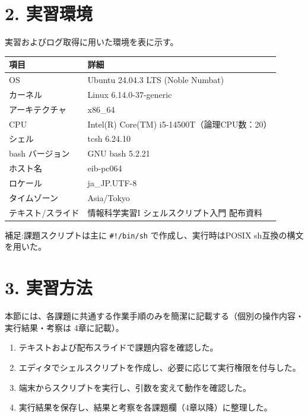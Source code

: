 \documentclass[12pt,a4paper]{jsarticle}
\begin{document}
\section*{2. 実習環境}
実習およびログ取得に用いた環境を表に示す。\par
\vspace{0.6cm}

\noindent
\begin{tabular}{|l|l|}
\hline
\textbf{項目} & \textbf{詳細} \\
\hline
OS & Ubuntu 24.04.3 LTS (Noble Numbat) \\
\hline
カーネル & Linux 6.14.0-37-generic \\
\hline
アーキテクチャ & x86\_64 \\
\hline
CPU & Intel(R) Core(TM) i5-14500T（論理CPU数：20） \\
\hline
シェル & tcsh 6.24.10 \\
\hline
bash バージョン & GNU bash 5.2.21 \\
\hline
ホスト名 & eib-pc064 \\
\hline
ロケール & ja\_JP.UTF-8 \\
\hline
タイムゾーン & Asia/Tokyo \\
\hline
テキスト/スライド & 情報科学実習I シェルスクリプト入門 配布資料 \\
\hline
\end{tabular}

\vspace{0.6cm}

\noindent
補足:\quad 課題スクリプトは主に \texttt{\#!/bin/sh} で作成し、実行時はPOSIX sh互換の構文を用いた。

\vspace{1.5cm}

\section*{3. 実習方法}

本節には、各課題に共通する作業手順のみを簡潔に記載する（個別の操作内容・実行結果・考察は 4章に記載）。\par
\vspace{0.4cm}

\begin{enumerate}
    \item テキストおよび配布スライドで課題内容を確認した。
    \item エディタでシェルスクリプトを作成し、必要に応じて実行権限を付与した。
    \item 端末からスクリプトを実行し、引数を変えて動作を確認した。
    \item 実行結果を保存し、結果と考察を各課題欄（4章以降）に整理した。
\end{enumerate}
\end{document}
